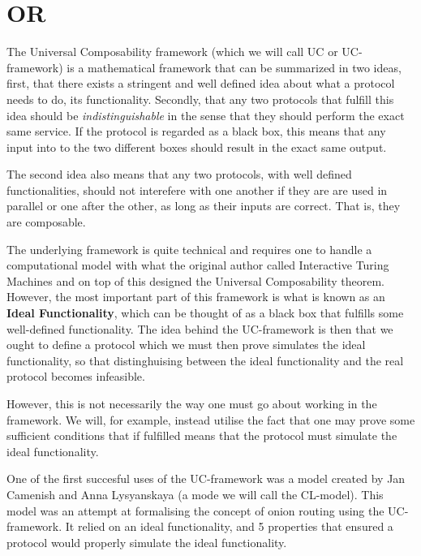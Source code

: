 \section{ \acl*{OR}}%
\label{UCOR}
The Universal Composability framework (which we will call UC or
UC-framework) is a mathematical framework that can be summarized in
two ideas, first, that there exists a stringent and well defined idea
about what a protocol needs to do, its functionality. Secondly, that
any two protocols that fulfill this idea should be {\it
  indistinguishable\/} in the sense that they should perform the exact
same service. If the protocol is regarded as a black box, this means
that any input into to the two different boxes should result in the
exact same output.

The second idea also means that any two protocols, with well defined
functionalities, should not interefere with one another if they are
are used in parallel or one after the other, as long as their inputs
are correct. That is, they are composable.

The underlying framework is quite technical and requires one to handle
a computational model with what the original author %
called Interactive Turing Machines and on top of this designed the
Universal Composability theorem. However, the most important part of
this framework is what is known as an {\bf Ideal Functionality}, which
can be thought of as a black box that fulfills some well-defined
functionality. The idea behind the UC-framework is then that we ought
to define a protocol which we must then prove simulates the ideal
functionality, so that distinghuising between the ideal functionality
and the real protocol becomes infeasible.

However, this is not necessarily the way one must go about working in
the framework. We will, for example, instead utilise the fact that one
may prove some sufficient conditions that if fulfilled means that the
protocol must simulate the ideal functionality.

One of the first succesful uses of the UC-framework was a model
created by Jan Camenish and Anna Lysyanskaya (a mode we will call the
CL-model). This model was an attempt at formalising the concept of
onion routing using the UC-framework. It relied on an ideal
functionality, and 5 properties that ensured a protocol would properly
simulate the ideal functionality.

